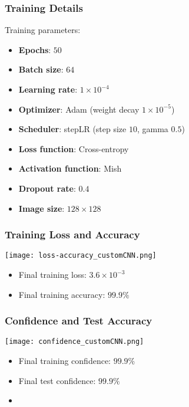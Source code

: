 \documentclass[../presentation.tex]{subfiles} %
\begin{document}
\begin{frame}
    
    \frametitle{Training Details}

    Training parameters:
    \vspace{0.2cm}
    \begin{itemize}
        \item \textbf{Epochs}: $50$
        \item \textbf{Batch size}: $64$
        \item \textbf{Learning rate}: $1\times10^{-4}$
        \item \textbf{Optimizer}: Adam (weight decay $1\times10^{-5}$)
        \item \textbf{Scheduler}: stepLR (step size $10$, gamma $0.5$)
        \item \textbf{Loss function}: Cross-entropy
        \item \textbf{Activation function}: Mish
        \item \textbf{Dropout rate}: $0.4$
        \item \textbf{Image size}: $128\times128$
    \end{itemize}

\end{frame}

\begin{frame}
    
    \frametitle{Training Loss and Accuracy}

    \begin{center}
        \texttt{[image: loss-accuracy\_customCNN.png]}
    \end{center}

    \small{
    \begin{cbox}
        \begin{itemize}
            \item Final training loss: $3.6\times10^{-3}$
            \item Final training accuracy: $99.9\%$
        \end{itemize}
    \end{cbox}
    }

\end{frame}

\begin{frame}
    
    \frametitle{Confidence and Test Accuracy}

    \begin{center}
        \texttt{[image: confidence\_customCNN.png]}
    \end{center}

    \small{
    \begin{cbox}
        \begin{itemize}
            \item Final training confidence: $99.9\%$
            \item Final test confidence: $99.9\%$
            \item {}
        \end{itemize}
    \end{cbox}
    }

\end{frame}
\end{document}
